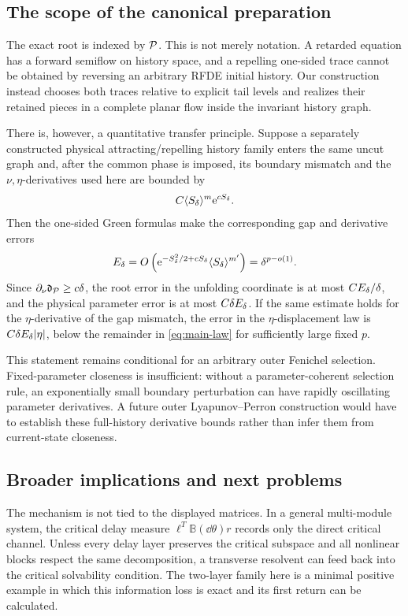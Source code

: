 \subsection{The scope of the canonical preparation}

The exact root is indexed by \(\mathcal P\).  This is not merely notation.  A
retarded equation has a forward semiflow on history space, and a repelling
one-sided trace cannot be obtained by reversing an arbitrary RFDE initial
history.  Our construction instead chooses both traces relative to explicit
tail levels and realizes their retained pieces in a complete planar flow
inside the invariant history graph.

There is, however, a quantitative transfer principle.  Suppose a separately
constructed physical attracting/repelling history family enters the same
uncut graph and, after the common phase is imposed, its boundary mismatch
and the \(\nu,\eta\)-derivatives used here are bounded by
\[
 C\langle S_\delta\rangle^m\mathrm e^{cS_\delta}.
\]
Then the one-sided Green formulas make the corresponding gap and derivative
errors
\[
 E_\delta=O\left(\mathrm e^{-S_\delta^2/2+cS_\delta}
                    \langle S_\delta\rangle^{m'}\right)
 =\delta^{p-o(1)}.
\]
Since \(\partial_\nu\mathfrak d_\mathcal P\ge c\delta\), the root error in the
unfolding coordinate is at most \(CE_\delta/\delta\), and the physical
parameter error is at most \(C\delta E_\delta\).  If the same estimate holds
for the \(\eta\)-derivative of the gap mismatch, the error in the
\(\eta\)-displacement law is \(C\delta E_\delta|\eta|\), below the remainder
in \cref{eq:main-law} for sufficiently large fixed \(p\).

This statement remains conditional for an arbitrary outer Fenichel
selection.  Fixed-parameter closeness is insufficient: without a
parameter-coherent selection rule, an exponentially small boundary
perturbation can have rapidly oscillating parameter derivatives.  A future
outer Lyapunov--Perron construction would have to establish these
full-history derivative bounds rather than infer them from current-state
closeness.

\subsection{Broader implications and next problems}

The mechanism is not tied to the displayed matrices.  In a general
multi-module system, the critical delay measure
\(\ell^T\mathbb B(\dd\theta)r\) records only the direct critical channel.
Unless every delay layer preserves the critical subspace and all nonlinear
blocks respect the same decomposition, a transverse resolvent can feed back
into the critical solvability condition.  The two-layer family here is a
minimal positive example in which this information loss is exact and its
first return can be calculated.

